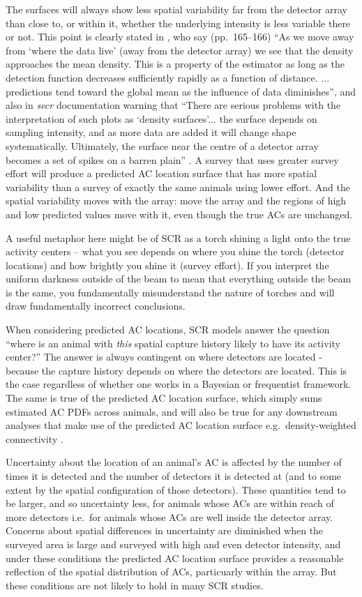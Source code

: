 \documentclass[useAMS,usenatbib,referee]{biom}
\begin{document}
The surfaces will always show less spatial variability far from the detector array than close to, or within it, whether the underlying intensity is less variable there or not. This point is clearly stated in \cite{Royle+al:13a}, who say (pp.\ 165--166) ``As we move away from `where the data live' (away from the detector array) we see that the density approaches the mean density. This is a property of the estimator as long as the detection function decreases sufficiently rapidly as a function of distance. ... predictions tend toward the global mean as the influence of data diminishes'', and also in \textit{secr} documentation warning that ``There are serious problems with the interpretation of such plots as `density surfaces'... the surface depends on sampling intensity, and as more data are added it will change shape systematically. Ultimately, the surface near the centre of a detector array becomes a set of spikes on a barren plain'' \citep{secr:22}. A survey that uses greater survey effort will produce a predicted AC location surface that has more spatial variability than a survey of exactly the same animals using lower effort. And the spatial variability moves with the array: move the array and the regions of high and low predicted values move with it, even though the true ACs are unchanged.

A useful metaphor here might be of SCR as a torch shining a light onto the true activity centers -- what you see depends on where you shine the torch (detector locations) and how brightly you shine it (survey effort). If you interpret the uniform darkness outside of the beam to mean that everything outside the beam is the same, you fundamentally misunderstand the nature of torches and will draw fundamentally incorrect conclusions.

When considering predicted AC locations, SCR models answer the question ``where is an animal with {\it this} spatial capture history likely to have its activity center?'' The answer is always contingent on where detectors are located - because the capture history depends on where the detectors are located. This is the case regardless of whether one works in a Bayesian or frequentist framework. The same is true of the predicted AC location surface, which simply sums estimated AC PDFs across animals, and will also be true for any downstream analyses that make use of the predicted AC location surface e.g.\ density-weighted connectivity \citep{Morin2017}. 

Uncertainty about the location of an animal's AC is affected by the number of times it is detected and the number of detectors it is detected at (and to some extent by the spatial configuration of those detectors). These quantities tend to be larger, and so uncertainty less, for animals whose ACs are within reach of more detectors i.e.\ for animals whose ACs are well inside the detector array. Concerns about spatial differences in uncertainty are diminished when the surveyed area is large and surveyed with high and even detector intensity, and under these conditions the predicted AC location surface provides a reasonable reflection of the spatial distribution of ACs, particuarly within the array. But these conditions are not likely to hold in many SCR studies.
\end{document}
